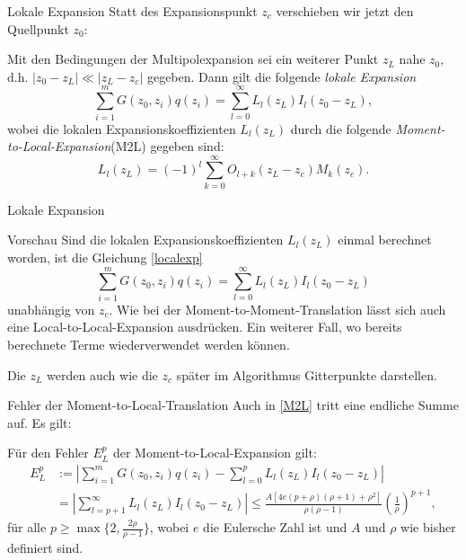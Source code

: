 \documentclass[ngerman]{beamer}
\begin{document}
\begin{frame}{Lokale Expansion}
Statt des Expansionspunkt $z_c$ verschieben wir jetzt den Quellpunkt $z_0$:
\begin{Satz}
Mit den Bedingungen der Multipolexpansion sei ein weiterer Punkt $z_L$ nahe $z_0$, d.h. $|z_0-z_L|\ll |z_L-z_c|$ gegeben. Dann gilt die folgende \emph{lokale Expansion}
\begin{equation}\label{localexp}
\sum_{i=1}^m {G(z_0,z_i)q(z_i)} = \sum_{l=0}^\infty L_l(z_L)I_l(z_0-z_L),
\end{equation}
wobei die lokalen Expansionskoeffizienten $L_l(z_L)$ durch die folgende \emph{Moment-to-Local-Expansion}(M2L) gegeben sind:
\begin{equation}\label{M2L}
L_l(z_L)=(-1)^l\sum_{k=0}^\infty O_{l+k}(z_L-z_c)M_k(z_c).
\end{equation}
\end{Satz}
\end{frame}

\begin{frame}{Lokale Expansion}
\begin{block}{Vorschau}
Sind die lokalen Expansionskoeffizienten $L_l(z_L)$ einmal berechnet worden, ist die Gleichung \eqref{localexp} 
\[\sum_{i=1}^m {G(z_0,z_i)q(z_i)} = \sum_{l=0}^\infty L_l(z_L)I_l(z_0-z_L)
\]
unabhängig von $z_c$. Wie bei der Moment-to-Moment-Translation lässt sich auch eine Local-to-Local-Expansion ausdrücken. Ein weiterer Fall, wo bereits berechnete Terme wiederverwendet werden können.

Die $z_L$ werden auch wie die $z_c$ später im Algorithmus Gitterpunkte darstellen.
\end{block}
\end{frame}

\begin{frame}{Fehler der Moment-to-Local-Translation}
Auch in \eqref{M2L} tritt eine endliche Summe auf. Es gilt:
\begin{Satz}
Für den Fehler $E_L^p$ der Moment-to-Local-Expansion gilt:
\begin{align*}
E^p_L&:= \left|\sum_{i=1}^m {G(z_0,z_i)q(z_i)} - \sum_{l=0}^p L_l(z_L)I_l(z_0-z_L)\right|\\
&=\left|\sum_{l=p+1}^\infty L_l(z_L)I_l(z_0-z_L)\right| \leq \frac{A\left[4e(p+\rho)(\rho+1)+\rho^2\right]}{\rho(\rho-1)}\left(\frac{1}{\rho}\right)^{p+1},
\end{align*}
für alle $p\geq \max\{2, \frac{2\rho}{\rho-1}\}$, wobei $e$ die Eulersche Zahl ist und $A$ und $\rho$ wie bisher definiert sind.
\end{Satz}
\end{frame}
\end{document}
